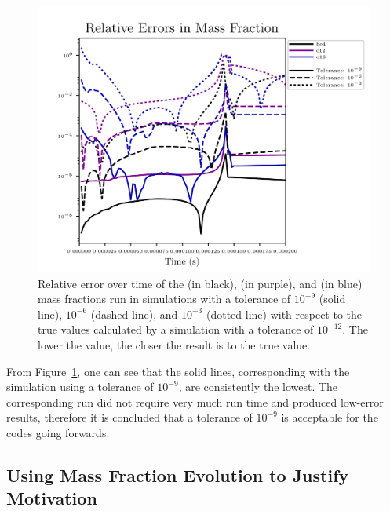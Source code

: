 \documentclass[11pt, oneside]{article}   	%
\begin{document}
      \begin{figure}
        \centering
        \includegraphics[width=5in]{images/react_aprox13_test13_ureca_tol-rel_xn1.png}
        \caption{Relative error over time of the  (in black),  (in purple), and  (in blue) mass fractions run in simulations with a tolerance of $10^{-9}$ (solid line), $10^{-6}$ (dashed line), and $10^{-3}$ (dotted line) with respect to the true values calculated by a simulation with a tolerance of $10^{-12}$. The lower the value, the closer the result is to the true value. %
          }
        \label{fig:relativeerror}
      \end{figure}  
  
      From Figure~\ref{fig:relativeerror}, one can see that the solid lines, corresponding with the simulation using a tolerance of $10^{-9}$, are consistently the lowest. The corresponding run did not require very much run time and produced low-error results, therefore it is concluded that a tolerance of $10^{-9}$ is acceptable for the codes going forwards. 
  
    \subsection{Using Mass Fraction Evolution to Justify Motivation}
    
\end{document}
